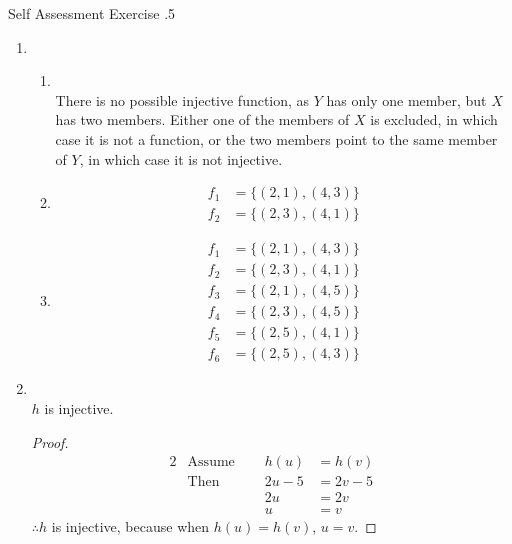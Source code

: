 \documentclass[../notes.tex]{subfiles}
\begin{document}
				\begin{exercise}{Self Assessment Exercise \thechapter.5}
					\begin{enumerate}
						\item {}
							\begin{enumerate}
								\item {}\\
									There is no possible injective function, as $Y$ has only one member, but $X$ has two members. Either one of the members of $X$ is excluded, in which case it is not a function, or the two members point to the same member of $Y$, in which case it is not injective.
								\item {}
									\begin{align*}
										f_{1} &= \bigl\{(2, 1), (4, 3)\bigr\}\\
										f_{2} &= \bigl\{(2, 3), (4, 1)\bigr\}
									\end{align*}
								\item {}
									\begin{align*}
										f_{1} &= \bigl\{(2, 1), (4, 3)\bigr\}\\
										f_{2} &= \bigl\{(2, 3), (4, 1)\bigr\}\\
										f_{3} &= \bigl\{(2, 1), (4, 5)\bigr\}\\
										f_{4} &= \bigl\{(2, 3), (4, 5)\bigr\}\\
										f_{5} &= \bigl\{(2, 5), (4, 1)\bigr\}\\
										f_{6} &= \bigl\{(2, 5), (4, 3)\bigr\}
									\end{align*}
							\end{enumerate}
						\item {}\\
							$h$ is injective.
							\begin{proof} \moveup
								\begin{alignat*}{2}
									& \text{Assume } \quad &h(u) &= h(v)\\
									& \text{Then } &2u - 5 &= 2v - 5\\
									& & 2u &= 2v\\
									& & u &= v
								\end{alignat*}
								$\therefore h$ is injective, because when $h(u) = h(v)$, $u = v$.
							\end{proof}
					\end{enumerate}
				\end{exercise}
			\pagebreak
\end{document}
